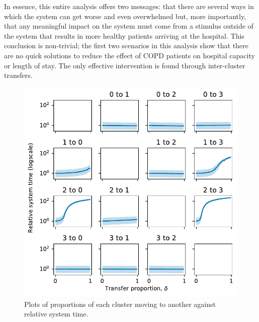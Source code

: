 In essence, this entire analysis offers two messages: that there are several
ways in which the system can get worse and even overwhelmed but, more
importantly, that any meaningful impact on the system must come from a stimulus
outside of the system that results in more healthy patients arriving at the
hospital. This conclusion is non-trivial; the first two scenarios in this
analysis show that there are no quick solutions to reduce the effect of COPD
patients on hospital capacity or length of stay. The only effective intervention
is found through inter-cluster transfers.

\begin{figure}
    \centering
    \includegraphics[width=\imgwidth]{moving_time}
    \caption{%
        Plots of proportions of each cluster moving to another against relative
        system time.
    }\label{fig:moving_time}
\end{figure}

